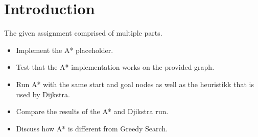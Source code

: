 \section{Introduction}
\label{sec:introduction}

The given assignment comprised of multiple parts.
\begin{itemize}
  \item Implement the A* placeholder.
  \item Test that the A* implementation works on the provided graph.
  \item Run A* with the same start and goal nodes as well as the heuristikk that is used by Dijkstra.
  \item Compare the results of the A* and Djikstra run.
  \item Discuss how A* is different from Greedy Search.
\end{itemize}
